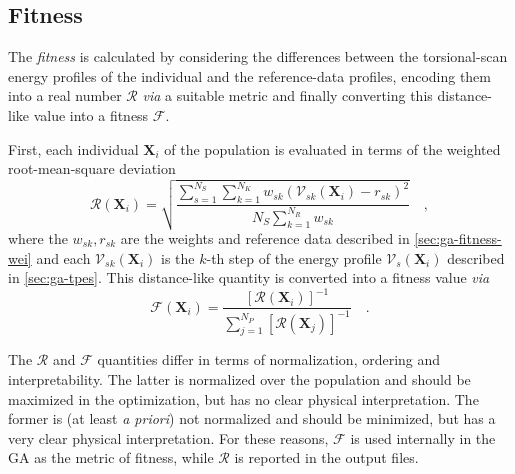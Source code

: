 \documentclass[10pt,a4paper,openany]{memoir}
\numberwithin{equation}{section}
\begin{document}
\subsection{Fitness}
\label{sec:ga-fitness}

The \textit{fitness} is calculated by considering the differences
between the torsional-scan energy profiles of the individual and the
reference-data profiles, encoding them into a real number
$\mathcal{R}$ \textit{via} a suitable metric and finally converting
this distance-like value into a fitness $\mathcal{F}$.

First, each individual $\mathbf{X}_i$ of the population is evaluated in terms
of the weighted root-mean-square deviation
\begin{equation}
  \label{eq:ga-fitness-rmsd}
  \mathcal{R}\left(\mathbf{X}_i\right) = \sqrt{\frac{\sum_{s=1}^{N_S} \sum_{k=1}^{N_K} w_{sk}(\mathcal{V}_{sk}(\mathbf{X}_i)-r_{sk})^2}{N_S \sum_{k=1}^{N_R} w_{sk}}} \quad ,
\end{equation}
where the $w_{sk},r_{sk}$ are the weights and reference data described in \autoref{sec:ga-fitness-wei}
and each $\mathcal{V}_{sk}(\mathbf{X}_{i})$ is the $k$-th step of the energy profile $\mathcal{V}_s(\mathbf{X}_i)$ described in \autoref{sec:ga-tpes}.
This distance-like quantity is converted into a fitness value \textit{via}
\begin{equation}
  \label{eq:ga-fitness}
  \mathcal{F}(\mathbf{X}_i) =\frac{\left[\mathcal{R}(\mathbf{X}_i)\right]^{-1}}{\sum_{j=1}^{N_P} \left[\mathcal{R}(\mathbf{X}_j)\right]^{-1}} \quad .
\end{equation}

  The $\mathcal{R}$ and $\mathcal{F}$ quantities differ in terms of normalization, ordering and interpretability.
The latter is normalized over the population and should be maximized in the optimization, but has no clear physical interpretation.
The former is (at least \textit{a priori}) not normalized and should be minimized, but has a very clear physical interpretation.
For these reasons, $\mathcal{F}$ is used internally in the GA as the metric of fitness, while $\mathcal{R}$ is reported in the output files.
\end{document}
